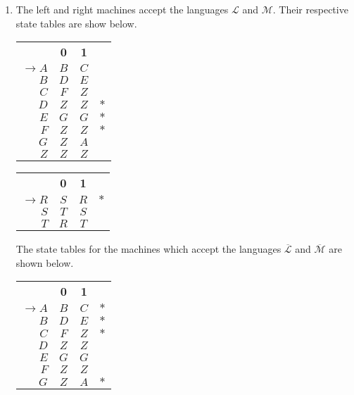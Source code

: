 \documentclass[a4paper,11pt]{article}
\begin{document}
\begin{enumerate}
		\item The left and right machines accept the languages $\mathcal{L}$ and $\mathcal{M}$. Their respective state tables are show below.
		\begin{center}
			\begin{tabular}{r|c|c|l}
				\cline{2-3}
				& {\bf 0} & {\bf 1} & \\ \cline{2-3}
				$\to A$	 & $B$ & $C$ &        \\ \cline{2-3}
				$B$	 	 & $D$ & $E$ &        \\ \cline{2-3}
				$C$	 	 & $F$ & $Z$ &        \\ \cline{2-3}
				$D$	 	 & $Z$ & $Z$ & $\ast$ \\ \cline{2-3}
				$E$	 	 & $G$ & $G$ & $\ast$ \\ \cline{2-3}
				$F$	 	 & $Z$ & $Z$ & $\ast$ \\ \cline{2-3}
				$G$	 	 & $Z$ & $A$ &        \\ \cline{2-3}
				$Z$	 	 & $Z$ & $Z$ &        \\ \cline{2-3}
			\end{tabular}
			\qquad
			\begin{tabular}{r|c|c|l}
				\cline{2-3}
				& {\bf 0} & {\bf 1} & \\ \cline{2-3}
				$\to R$	 & $S$ & $R$ & $\ast$ \\ \cline{2-3}
				$S$	 	 & $T$ & $S$ &        \\ \cline{2-3}
				$T$	 	 & $R$ & $T$ &        \\ \cline{2-3}
			\end{tabular}
		\end{center}
		The state tables for the machines which accept the languages $\overline{\mathcal{L}}$ and $\overline{\mathcal{M}}$ are shown below.
		\begin{center}
			\begin{tabular}{r|c|c|l}
				\cline{2-3}
				& {\bf 0} & {\bf 1} & \\ \cline{2-3}
				$\to A$	 & $B$ & $C$ & $\ast$ \\ \cline{2-3}
				$B$	 	 & $D$ & $E$ & $\ast$ \\ \cline{2-3}
				$C$	 	 & $F$ & $Z$ & $\ast$ \\ \cline{2-3}
				$D$	 	 & $Z$ & $Z$ &        \\ \cline{2-3}
				$E$	 	 & $G$ & $G$ &        \\ \cline{2-3}
				$F$	 	 & $Z$ & $Z$ &        \\ \cline{2-3}
				$G$	 	 & $Z$ & $A$ & $\ast$ \\ \cline{2-3}

\end{tabular}
\end{center}
\end{enumerate}
\end{document}
